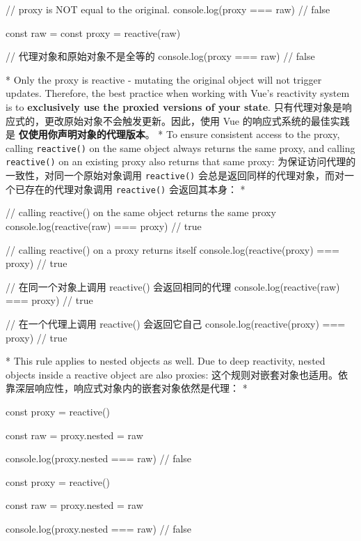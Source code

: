 \begin{paracol}{2}
\begin{codeJs}
// proxy is NOT equal to the original.
console.log(proxy === raw) // false    
\end{codeJs}
\switchcolumn
\begin{codeJs}
const raw = {}
const proxy = reactive(raw)

// 代理对象和原始对象不是全等的
console.log(proxy === raw) // false
\end{codeJs} 

\switchcolumn[0]*%
Only the proxy is reactive - mutating the original object will not
trigger updates. Therefore, the best practice when working with Vue's
reactivity system is to \textbf{exclusively use the proxied versions of
your state}.
\switchcolumn
只有代理对象是响应式的，更改原始对象不会触发更新。因此，使用 Vue
的响应式系统的最佳实践是 \textbf{仅使用你声明对象的代理版本}。
\switchcolumn[0]*%
To ensure consistent access to the proxy, calling \texttt{reactive()} on
the same object always returns the same proxy, and calling
\texttt{reactive()} on an existing proxy also returns that same proxy:
\switchcolumn
为保证访问代理的一致性，对同一个原始对象调用 \texttt{reactive()}
会总是返回同样的代理对象，而对一个已存在的代理对象调用
\texttt{reactive()} 会返回其本身：
\switchcolumn[0]*%
\begin{codeJs}
// calling reactive() on the same object returns the same proxy
console.log(reactive(raw) === proxy) // true

// calling reactive() on a proxy returns itself
console.log(reactive(proxy) === proxy) // true
\end{codeJs}
\switchcolumn
\begin{codeJs}
// 在同一个对象上调用 reactive() 会返回相同的代理
console.log(reactive(raw) === proxy) // true

// 在一个代理上调用 reactive() 会返回它自己
console.log(reactive(proxy) === proxy) // true
\end{codeJs}
\switchcolumn[0]*%
This rule applies to nested objects as well. Due to deep reactivity,
nested objects inside a reactive object are also proxies:
\switchcolumn
这个规则对嵌套对象也适用。依靠深层响应性，响应式对象内的嵌套对象依然是代理：
\switchcolumn[0]*%
\begin{codeJs}
const proxy = reactive({})

const raw = {}
proxy.nested = raw

console.log(proxy.nested === raw) // false
\end{codeJs}
\switchcolumn
\begin{codeJs}
const proxy = reactive({})

const raw = {}
proxy.nested = raw

console.log(proxy.nested === raw) // false
\end{codeJs}

\end{paracol}



